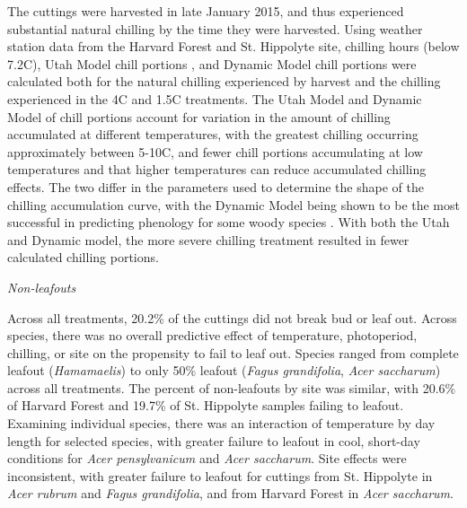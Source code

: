 \documentclass{article}
\begin{document}
\noindent The cuttings were harvested in late January 2015, and thus experienced substantial natural chilling by the time they were harvested. Using weather station data from the Harvard Forest and St. Hippolyte site, chilling hours (below 7.2\degree C), Utah Model chill portions \citep{utahmodel}, and Dynamic Model \citep{Erez:1988} chill portions were calculated both for the natural chilling experienced by harvest and the chilling experienced in the 4\degree C and 1.5\degree C treatments. The Utah Model and Dynamic Model of chill portions account for variation in the amount of chilling accumulated at different temperatures, with the greatest chilling occurring approximately between 5-10\degree C, and fewer chill portions accumulating at low temperatures and that higher temperatures can reduce accumulated chilling effects. The two differ in the parameters used to determine the shape of the chilling accumulation curve, with the Dynamic Model being shown to be the most successful in predicting phenology for some woody species \citep{Luedeling:2009}.
With both the Utah and Dynamic model, the more severe chilling treatment resulted in fewer calculated chilling portions. 

\noindent\emph{Non-leafouts}

\noindent Across all treatments, 20.2\% of the cuttings did not break bud or leaf out. Across species, there was no overall predictive effect of temperature, photoperiod, chilling, or site on the propensity to fail to leaf out. Species ranged from complete leafout (\emph{Hamamaelis}) to only 50\% leafout (\emph{Fagus grandifolia}, \emph{Acer saccharum}) across all treatments. The percent of non-leafouts by site was similar, with 20.6\% of Harvard Forest and 19.7\% of St. Hippolyte samples failing to leafout. Examining individual species,  there was an interaction of temperature by day length for selected species, with greater failure to leafout in cool, short-day conditions for \emph{Acer pensylvanicum}  and \emph{Acer saccharum}. Site effects were inconsistent, with greater failure to leafout for cuttings from St. Hippolyte in \emph{Acer rubrum} and \emph{Fagus grandifolia}, and from Harvard Forest in \emph{Acer saccharum}. 


\end{document}
